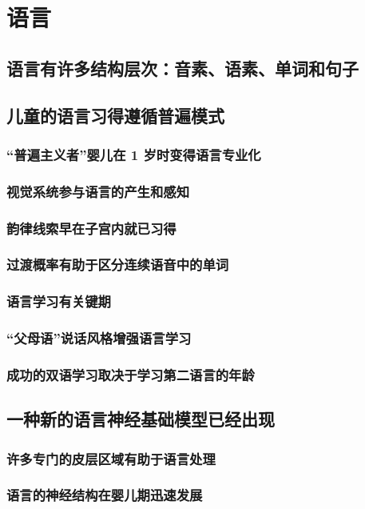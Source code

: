 \chapter{语言}

\section{语言有许多结构层次：音素、语素、单词和句子}

\section{儿童的语言习得遵循普遍模式}
\subsection{“普遍主义者”婴儿在 1 岁时变得语言专业化}
\subsection{视觉系统参与语言的产生和感知}
\subsection{韵律线索早在子宫内就已习得}
\subsection{过渡概率有助于区分连续语音中的单词}
\subsection{语言学习有关键期}
\subsection{“父母语”说话风格增强语言学习}
\subsection{成功的双语学习取决于学习第二语言的年龄}

\section{一种新的语言神经基础模型已经出现}
\subsection{许多专门的皮层区域有助于语言处理}
\subsection{语言的神经结构在婴儿期迅速发展}
